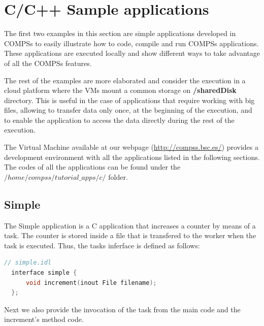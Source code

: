 \section{C/C++ Sample applications}
\label{sec:CSampleApps}

The first two examples in this section are simple applications developed in COMPSs to easily illustrate how to code,
compile and run COMPSs applications. These applications are executed locally and show different ways to take advantage
of all the COMPSs features. 

The rest of the examples are more elaborated and consider the execution in a cloud platform where the VMs mount a common 
storage on \textbf{/sharedDisk} directory. This is useful in the case of applications that require working 
with big files, allowing to transfer data only once, at the beginning of the execution, and to enable 
the application to access the data directly during the rest of the execution.

The Virtual Machine available at our webpage (\url{http://compss.bsc.es/}) provides a development environment with
all the applications listed in the following sections. The codes of all the applications can be found under the 
$/home/compss/tutorial\_apps/c/$ folder. 


\subsection{Simple}
The Simple application is a C application that increases a counter by means of a task. The counter is stored inside a file that 
is transfered to the worker when the task is executed. Thus, the tasks inferface is defined as follows:

\begin{lstlisting}[language=c]
  // simple.idl
  interface simple {
	  void increment(inout File filename);
  };
\end{lstlisting}

Next we also provide the invocation of the task from the main code and the increment's method code.

